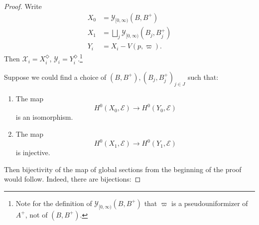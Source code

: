 \documentclass[10pt,twoside]{article}
\numberwithin{equation}{section}
\theoremstyle{plain}
\theoremstyle{definition}
\newcommand{\MCE}{\mathcal{E}}
\newcommand{\MCX}{\mathcal{X}}
\newcommand{\MCY}{\mathcal{Y}}
\let \diamond \Diamond
\newcommand{\Yco}{\MCY_{[0,\infty)}}
\begin{document}
\begin{proof}
Write 
\begin{align*}
    X_0&=\Yco(B,B^+)\\
    X_1&=\bigsqcup_j \Yco(B_j,B^+_j)\\
    Y_i& = X_i-V(p,\varpi).
\end{align*}
Then \(\MCX_i=X_i^\diamond\), \(\MCY_i=Y_i^{\diamond}\).\footnote{Note for the definition of \(\Yco(B,B^+)\) that \(\varpi\) is a pseudouniformizer of \(A^+\), not of \((B,B^+)\).}\par
Suppose we could find a choice of \((B,B^+),(B_j,B_j^+)_{j\in J}\) such that:
\begin{enumerate}
        \item The map \[H^0(X_0,\MCE)\longrightarrow H^0(Y_0, \MCE)\] is an isomorphism.
        \item The map \[H^0(X_1,\MCE)\longrightarrow H^0(Y_1, \MCE)\] is injective.
\end{enumerate}

Then bijectivity of the map of global sections from the beginning of the proof would follow. Indeed, there are bijections:


\end{proof}
\end{document}
